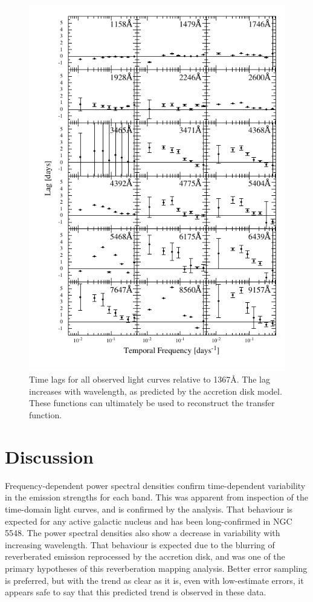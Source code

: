 \documentclass[11pt,letterpaper]{article}
\begin{document}
    \begin{figure}
        \centering
        \includegraphics[width=.9\textwidth]{../img/timelag_atlas.pdf}
        \caption{Time lags for all observed light curves relative to 1367\AA. The lag increases with wavelength, as predicted by the accretion disk model. These functions can ultimately be used to reconstruct the transfer function.}
        \label{timelag_atlas}
    \end{figure}

\section{Discussion}

Frequency-dependent power spectral densities confirm time-dependent variability in the emission strengths for each band. This was apparent from inspection of the time-domain light curves, and is confirmed by the analysis. That behaviour is expected for any active galactic nucleus and has been long-confirmed in NGC 5548. The power spectral densities also show a decrease in variability with increasing wavelength. That behaviour is expected due to the blurring of reverberated emission reprocessed by the accretion disk, and was one of the primary hypotheses of this reverberation mapping analysis. Better error sampling is preferred, but with the trend as clear as it is, even with low-estimate errors, it appears safe to say that this predicted trend is observed in these data.
\end{document}
